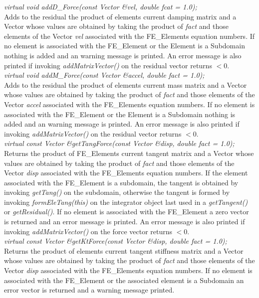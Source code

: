 {\em virtual void addD\_Force(const Vector \&vel, double fcat = 1.0); }\\
Adds to the residual the product of elements current damping matrix
and a Vector whose values are obtained by taking the product of {\em
fact} and those elements of the Vector {\em vel} associated with 
the FE\_Elements equation numbers. If no element is associated with the
FE\_Element or the Element is a Subdomain nothing is added and an
warning message is printed. An error message is also printed if invoking
{\em addMatrixVector()} on the residual vector returns $< 0$.\\


{\em virtual void addM\_Force(const Vector \&accel, double fact = 1.0); }\\
Adds to the residual the product of elements current mass matrix
and a Vector whose values are obtained by taking the product of {\em
fact} and those elements of the Vector {\em accel} associated with 
the FE\_Elements equation numbers. If no element is associated with the
FE\_Element or the Element is a Subdomain nothing is added and an
warning message is printed. An error message is also printed if invoking
{\em addMatrixVector()} on the residual vector returns $< 0$.\\

{\em virtual const Vector \&getTangForce(const Vector \&disp, double
fact = 1.0);    }\\
Returns the product of FE\_Elements current tangent matrix
and a Vector whose values are obtained by taking the product of {\em
fact} and those elements of the Vector {\em disp} associated with 
the FE\_Elements equation numbers. If the element associated with the
FE\_Element is a subdomain, the tangent is obtained by invoking {\em
getTang()} on the subdomain, otherwise the tangent is formed by
invoking {\em formEleTang(this)} on the integrator object last used in
a {\em getTangent()} or {\em getResidual()}.
If no element is associated with the
FE\_Element a zero vector is returned and an error message is
printed. An error message is also printed if invoking
{\em addMatrixVector()} on the force vector returns $< 0$. \\

{\em virtual const Vector \&getKtForce(const Vector \&disp, double
fact = 1.0);    }\\
Returns the product of elements current tangent stiffness matrix
and a Vector whose values are obtained by taking the product of {\em
fact} and those elements of the Vector {\em disp} associated with 
the FE\_Elements equation numbers. If no element is associated with the
FE\_Element or the associated element is a Subdomain an error vector
is returned and a warning message printed. \\

